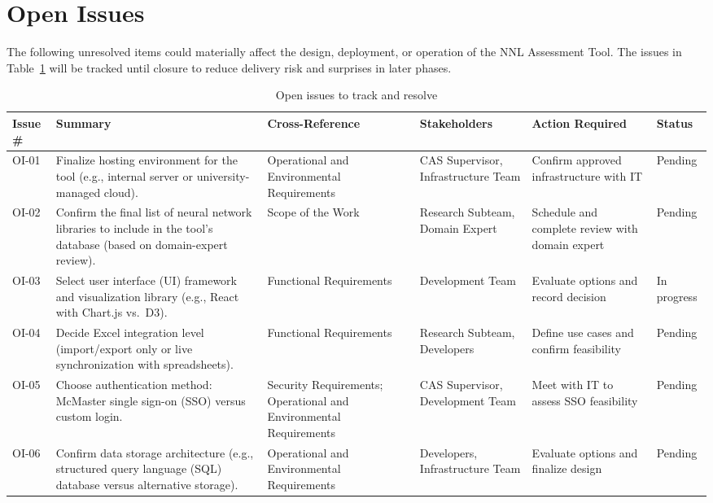 \documentclass[12pt]{article}
\begin{document}
\section{Open Issues}

The following unresolved items could materially affect the design, deployment,
or operation of the NNL Assessment Tool. The issues in
Table~\ref{tab:open-issues} will be tracked until closure to reduce delivery
risk and surprises in later phases.

\begin{table}[hp]
\caption{Open issues to track and resolve} \label{tab:open-issues}
\begin{tabularx}{\textwidth}{p{1.6cm}X X X X p{2.1cm}}
\toprule
\textbf{Issue \#} & \textbf{Summary} & \textbf{Cross-Reference} &
\textbf{Stakeholders} & \textbf{Action Required} & \textbf{Status} \\
\midrule
OI-01 & Finalize hosting environment for the tool (e.g., internal server or
university-managed cloud). & Operational and Environmental Requirements &
CAS Supervisor, Infrastructure Team & Confirm approved infrastructure with IT &
Pending \\
\addlinespace[0.3em]
OI-02 & Confirm the final list of neural network libraries to include in the
tool’s database (based on domain-expert review). & Scope of the Work &
Research Subteam, Domain Expert & Schedule and complete review with domain
expert & Pending \\
\addlinespace[0.3em]
OI-03 & Select user interface (UI) framework and visualization library
(e.g., React with Chart.js vs.\ D3). & Functional Requirements &
Development Team & Evaluate options and record decision & In progress \\
\addlinespace[0.3em]
OI-04 & Decide Excel integration level (import/export only or live
synchronization with spreadsheets). & Functional Requirements & Research
Subteam, Developers & Define use cases and confirm feasibility & Pending \\
\addlinespace[0.3em]
OI-05 & Choose authentication method: McMaster single sign-on (SSO) versus
custom login. & Security Requirements; Operational and Environmental
Requirements & CAS Supervisor, Development Team & Meet with IT to assess SSO
feasibility & Pending \\
\addlinespace[0.3em]
OI-06 & Confirm data storage architecture (e.g., structured query language
(SQL) database versus alternative storage). & Operational and Environmental
Requirements & Developers, Infrastructure Team & Evaluate options and finalize
design & Pending \\
\bottomrule
\end{tabularx}
\end{table}
\end{document}
